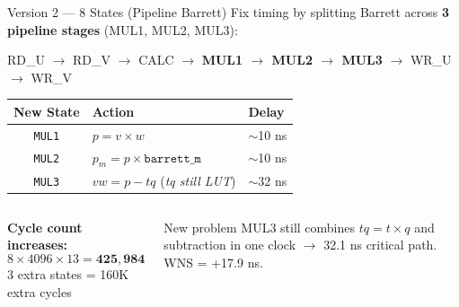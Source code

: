 \documentclass[aspectratio=169, 11pt]{beamer}
\begin{document}
\begin{frame}{Version 2 --- 8 States (Pipeline Barrett)}
Fix timing by splitting Barrett across \textbf{3 pipeline stages} (MUL1, MUL2, MUL3):

\vspace{0.3em}
\begin{center}
\ttfamily\small
RD\_U $\to$ RD\_V $\to$ CALC $\to$ \textbf{MUL1 $\to$ MUL2 $\to$ MUL3} $\to$ WR\_U $\to$ WR\_V
\end{center}

\vspace{0.3em}
\begin{center}
\small
\begin{tabular}{cll}
\toprule
\textbf{New State} & \textbf{Action} & \textbf{Delay} \\
\midrule
\texttt{MUL1} & $p = v \times w$                        & $\sim$10 ns \\
\texttt{MUL2} & $p_m = p \times \texttt{barrett\_m}$    & $\sim$10 ns \\
\texttt{MUL3} & $vw = p - tq$ \quad (\textit{tq still LUT}) & $\sim$32 ns \\
\bottomrule
\end{tabular}
\end{center}

\vspace{0.3em}
\begin{columns}
\textbf{Cycle count increases:}
\[8 \times 4096 \times 13 = \mathbf{425{,}984}\]
3 extra states = 160K extra cycles

\begin{alertblock}{New problem}
MUL3 still combines $tq = t \times q$ and subtraction in one clock $\to$ 32.1 ns critical path. WNS = +17.9 ns.
\end{alertblock}
\end{columns}
\end{frame}
\end{document}
